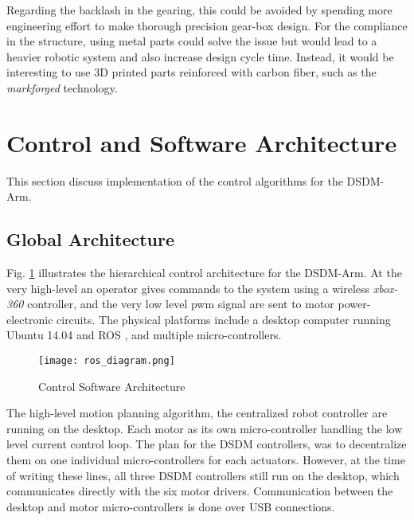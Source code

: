 Regarding the backlash in the gearing, this could be avoided by spending more engineering effort to make thorough precision gear-box design. For the compliance in the structure, using metal parts could solve the issue but would lead to a heavier robotic system and also increase design cycle time. Instead, it would be interesting to use 3D printed parts reinforced with carbon fiber, such as the \textit{markforged} technology. 




\newpage
\newpage

\section{Control and Software Architecture}
\label{sec:ControlSoftwareArchitecture}

This section discuss implementation of the control algorithms for the DSDM-Arm. 

\subsection{Global Architecture}

Fig. \ref{fig:archi_diagram} illustrates the hierarchical control architecture for the DSDM-Arm. At the very high-level an operator gives commands to the system using a wireless \textit{xbox-360} controller, and the very low level pwm signal are sent to motor power-electronic circuits. The physical platforms include a desktop computer running Ubuntu 14.04 and ROS \cite{quigley_ros:_2009}, and multiple micro-controllers. 

\begin{figure}[H]
	\centering
		\texttt{[image: ros\_diagram.png]}
	\caption{Control Software Architecture}
	\label{fig:archi_diagram}
\end{figure}

The high-level motion planning algorithm, the centralized robot controller are running on the desktop. Each motor as its own micro-controller handling the low level current control loop. The plan for the DSDM controllers, was to decentralize them on one individual micro-controllers for each actuators. However, at the time of writing these lines, all three DSDM controllers still run on the desktop, which communicates directly with the six motor drivers. Communication between the desktop and motor micro-controllers is done over USB connections.

